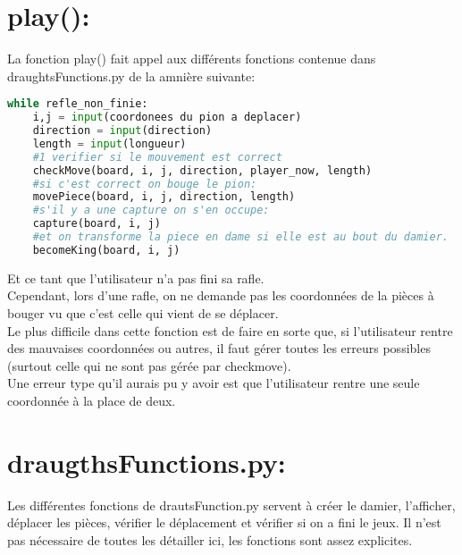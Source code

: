 \documentclass[10pt,a4paper]{report}
\begin{document}
\section*{play():}
La fonction play() fait appel aux différents fonctions contenue dans draughtsFunctions.py de la amnière suivante:
\begin{lstlisting}[language=Python]
while refle_non_finie:
	i,j = input(coordonees du pion a deplacer)
	direction = input(direction)
	length = input(longueur)
	#1 verifier si le mouvement est correct
	checkMove(board, i, j, direction, player_now, length)
	#si c'est correct on bouge le pion:
	movePiece(board, i, j, direction, length)
	#s'il y a une capture on s'en occupe:
	capture(board, i, j)
	#et on transforme la piece en dame si elle est au bout du damier.
	becomeKing(board, i, j)
\end{lstlisting}
Et ce tant que l'utilisateur n'a pas fini sa rafle.\\
Cependant, lors d'une rafle, on ne demande pas les coordonnées de la pièces à bouger vu que c'est celle qui vient de se déplacer.\\
Le plus difficile dans cette fonction est de faire en sorte que, si l'utilisateur rentre des mauvaises coordonnées ou autres, il faut gérer toutes les erreurs possibles (surtout celle qui ne sont pas gérée par checkmove).\\
Une erreur type qu'il aurais pu y avoir est que l'utilisateur rentre une seule coordonnée à la place de deux.

\section*{draugthsFunctions.py:}
Les différentes fonctions de drautsFunction.py servent à créer le damier, l'afficher, déplacer les pièces, vérifier le déplacement et vérifier si on a fini le jeux. Il n'est pas nécessaire de toutes les détailler ici, les fonctions sont assez explicites.
\end{document}
